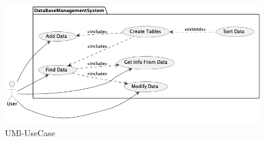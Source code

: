 \begin{parlist}
\begin{table}[hbt]
{\begin{tabular}{|l|l|}
\hline
\end{tabular}
}
\end{table} 
	\item
	 \begin{figure}[hbt]
	 	\label{fig1}
		\includegraphics[width=\textwidth]{Immagini/test.png}
	  \caption{UMl-UseCase}
\end{figure}

\end{parlist}
